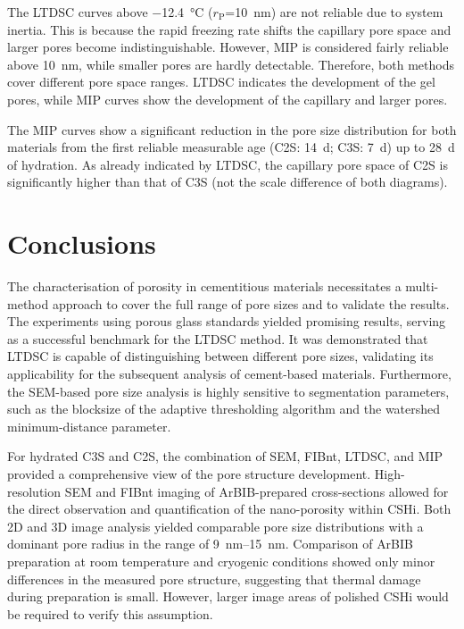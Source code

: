 The \ac{LTDSC} curves above \qty{-12.4}{\celsius} ($r_\text{P}$=\qty{10}{\nano\meter}) are not reliable due to system inertia.
This is because the rapid freezing rate shifts the capillary pore space and larger pores become indistinguishable.
However, \ac{MIP} is considered fairly reliable above \qty{10}{\nano\meter}, while smaller pores are hardly detectable.
Therefore, both methods cover different pore space ranges.
\ac{LTDSC} indicates the development of the gel pores, while \ac{MIP} curves show the development of the capillary and larger pores.

The \ac{MIP} curves show a significant reduction in the pore size distribution for both materials from the first reliable measurable age (\ac{C2S}: \qty{14}{\day}; \ac{C3S}: \qty{7}{\day}) up to \qty{28}{\day} of hydration.
As already indicated by \ac{LTDSC}, the capillary pore space of \ac{C2S} is significantly higher than that of \ac{C3S} (not the scale difference of both diagrams).

\FloatBarrier
\section{Conclusions}

The characterisation of porosity in cementitious materials necessitates a multi-method approach to cover the full range of pore sizes and to validate the results.
The experiments using porous glass standards yielded promising results, serving as a successful benchmark for the \ac{LTDSC} method.
It was demonstrated that \ac{LTDSC} is capable of distinguishing between different pore sizes, validating its applicability for the subsequent analysis of cement-based materials.
Furthermore, the \ac{SEM}-based pore size analysis is highly sensitive to segmentation parameters, such as the blocksize of the adaptive thresholding algorithm and the watershed minimum-distance parameter.

For hydrated \ac{C3S} and \ac{C2S}, the combination of \ac{SEM}, \ac{FIBnt}, \ac{LTDSC}, and \ac{MIP} provided a comprehensive view of the pore structure development.
High-resolution \ac{SEM} and \ac{FIBnt} imaging of \ac{ArBIB}-prepared cross-sections allowed for the direct observation and quantification of the nano-porosity within \ac{CSHi}.
Both 2D and 3D image analysis yielded comparable pore size distributions with a dominant pore radius in the range of \qtyrange{9}{15}{\nano\meter}.
Comparison of \ac{ArBIB} preparation at room temperature and cryogenic conditions showed only minor differences in the measured pore structure, suggesting that thermal damage during preparation is small.
However, larger image areas of polished \ac*{CSHi} would be required to verify this assumption.


